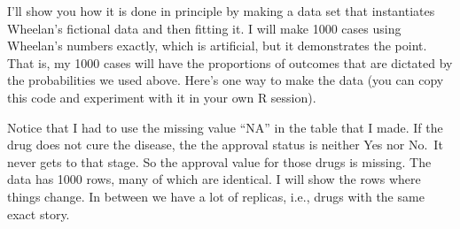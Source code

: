\documentclass[openany]{book}
\newenvironment{Shaded}{\begin{snugshade}}{\end{snugshade}}
\newcommand{\CommentTok}[1]{\textcolor[rgb]{0.56,0.35,0.01}{\textit{#1}}}
\newcommand{\DataTypeTok}[1]{\textcolor[rgb]{0.13,0.29,0.53}{#1}}
\newcommand{\DecValTok}[1]{\textcolor[rgb]{0.00,0.00,0.81}{#1}}
\newcommand{\KeywordTok}[1]{\textcolor[rgb]{0.13,0.29,0.53}{\textbf{#1}}}
\newcommand{\NormalTok}[1]{#1}
\newcommand{\OperatorTok}[1]{\textcolor[rgb]{0.81,0.36,0.00}{\textbf{#1}}}
\newcommand{\OtherTok}[1]{\textcolor[rgb]{0.56,0.35,0.01}{#1}}
\newcommand{\StringTok}[1]{\textcolor[rgb]{0.31,0.60,0.02}{#1}}
\begin{document}
I'll show you how it is done in principle by making a data set that instantiates Wheelan's fictional data and then fitting it. I will make 1000 cases using Wheelan's numbers exactly, which is artificial, but it demonstrates the point. That is, my 1000 cases will have the proportions of outcomes that are dictated by the probabilities we used above. Here's one way to make the data (you can copy this code and experiment with it in your own R session).

\begin{Shaded}
\end{Shaded}

Notice that I had to use the missing value ``NA'' in the table that I made. If the drug does not cure the disease, the the approval status is neither Yes nor No.~It never gets to that stage. So the approval value for those drugs is missing. The data has 1000 rows, many of which are identical. I will show the rows where things change. In between we have a lot of replicas, i.e., drugs with the same exact story.
\end{document}

